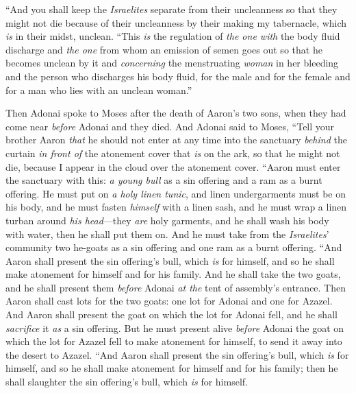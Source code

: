 \begin{biblechapter}
\verse “And you shall keep the \textit{Israelites} separate from their uncleanness so that they might not die because of their uncleanness by their making my tabernacle, which \textit{is} in their midst, unclean.
\verse “This \textit{is} the regulation of \textit{the one with} the body fluid discharge and \textit{the one} from whom an emission of semen goes out so that he becomes unclean by it
\verse and \textit{concerning} the menstruating \textit{woman} in her bleeding and the person who discharges his body fluid, for the male and for the female and for a man who lies with an unclean woman.”
\end{biblechapter}

\begin{biblechapter} %
 Then Adonai spoke to Moses after the death of Aaron’s two sons, when they had come near \textit{before} Adonai and they died.
\verse And Adonai said to Moses, “Tell your brother Aaron \textit{that} he should not enter at any time into the sanctuary \textit{behind} the curtain \textit{in front of} the atonement cover that \textit{is} on the ark, so that he might not die, because I appear in the cloud over the atonement cover.
\verse “Aaron must enter the sanctuary with this: \textit{a young bull} as a sin offering and a ram as a burnt offering.
\verse He must put on \textit{a holy linen tunic}, and linen undergarments must be on his body, and he must fasten \textit{himself} with a linen sash, and he must wrap a linen turban around \textit{his head}—they \textit{are} holy garments, and he shall wash his body with water, then he shall put them on.
\verse And he must take from the \textit{Israelites}’ community two he-goats as a sin offering and one ram as a burnt offering.
\verse “And Aaron shall present the sin offering’s bull, which \textit{is} for himself, and so he shall make atonement for himself and for his family.
\verse And he shall take the two goats, and he shall present them \textit{before} Adonai \textit{at the} tent of assembly’s entrance.
\verse Then Aaron shall cast lots for the two goats: one lot for Adonai and one for Azazel.
\verse And Aaron shall present the goat on which the lot for Adonai fell, and he shall \textit{sacrifice} it \textit{as} a sin offering.
\verse But he must present alive \textit{before} Adonai the goat on which the lot for Azazel fell to make atonement for himself, to send it away into the desert to Azazel.
\verse “And Aaron shall present the sin offering’s bull, which \textit{is} for himself, and so he shall make atonement for himself and for his family; then he shall slaughter the sin offering’s bull, which \textit{is} for himself.

\end{biblechapter}
